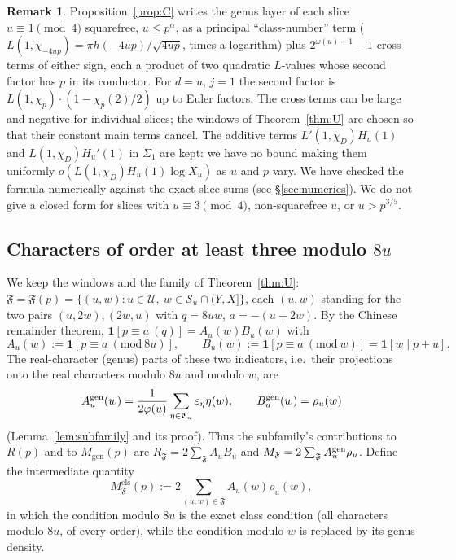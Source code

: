 \documentclass[11pt,reqno]{amsart}
\theoremstyle{definition}
\newtheorem{remark}[theorem]{Remark}
\newcommand{\eps}{\varepsilon}
\newcommand{\cE}{\mathfrak E}
\newcommand{\cF}{\mathfrak F}
\newcommand{\cS}{\mathcal S}
\newcommand{\cU}{\mathcal U}
\newcommand{\Mgen}{M_{\mathrm{gen}}}
\newcommand{\Mcls}{M^{\mathrm{cls}}}
\begin{document}
\begin{remark}
Proposition~\ref{prop:C} writes the genus layer of each slice
$u\equiv1\pmod4$ squarefree, $u\le p^{\alpha}$, as a principal
``class-number'' term ($L(1,\chi_{-4up})=\pi h(-4up)/\sqrt{4up}$, times a
logarithm) plus $2^{\omega(u)+1}-1$ cross terms of either sign, each a
product of two quadratic $L$-values whose second factor has $p$ in its
conductor.  For $d=u$, $j=1$ the second factor is
$L(1,\chi_p)\cdot(1-\chi_p(2)/2)$ up to Euler factors.  The cross terms can
be large and negative for individual slices; the windows of
Theorem~\ref{thm:U} are chosen so that their constant main terms
cancel.  The additive terms $L'(1,\chi_D)H_u(1)$ and $L(1,\chi_D)H_u'(1)$
in $\Sigma_1$ are kept: we have no bound making them uniformly
$o(L(1,\chi_D)H_u(1)\log X_u)$ as $u$ and $p$ vary.  We have checked the
formula numerically against the exact slice sums (see
\S\ref{sec:numerics}).  We do not give a closed form for slices with
$u\equiv3\pmod4$, non-squarefree $u$, or $u>p^{3/5}$.
\end{remark}

\subsection{Characters of order at least three modulo $8u$}\label{subsec:classD}
We keep the windows and the family of Theorem~\ref{thm:U}:
$\cF=\cF(p)=\{(u,w):u\in\cU,\ w\in\cS_u\cap(Y,X]\}$, each $(u,w)$
standing for the two pairs $(u,2w),(2w,u)$ with $q=8uw$, $a=-(u+2w)$.  By
the Chinese remainder theorem, $\mathbf 1[p\equiv a\ (q)]=A_u(w)B_u(w)$ with
\[
 A_u(w):=\mathbf 1[p\equiv a\ (\mathrm{mod}\ 8u)],\qquad
 B_u(w):=\mathbf 1[p\equiv a\ (\mathrm{mod}\ w)]=\mathbf 1[w\mid p+u].
\]
The real-character (genus) parts of these two indicators, i.e.\ their
projections onto the real characters modulo $8u$ and modulo $w$, are
\[
 A^{\rm gen}_u(w)=\frac{1}{2\varphi(u)}\sum_{\eta\in\cE_u}\eps_\eta\eta(w),
 \qquad B^{\rm gen}_u(w)=\rho_u(w)
\]
(Lemma~\ref{lem:subfamily} and its proof).  Thus the subfamily's
contributions to $R(p)$ and to $\Mgen(p)$ are
$R_\cF=2\sum_\cF A_uB_u$ and $M_\cF=2\sum_\cF A^{\rm gen}_u\rho_u$.  Define
the intermediate quantity
\[
 \Mcls_\cF(p):=2\sum_{(u,w)\in\cF}A_u(w)\rho_u(w),
\]
in which the condition modulo $8u$ is the exact class condition (all
characters modulo $8u$, of every order), while the condition modulo $w$
is replaced by its genus density.
\end{document}
